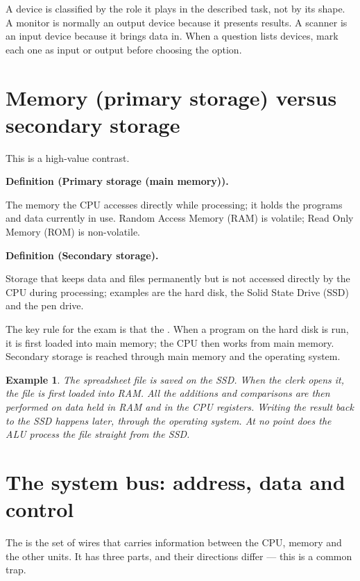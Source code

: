 \documentclass[11pt]{article}
\newtheorem{example}{Example}[section]
\newenvironment{definitionbox}[1]{%
  \par\noindent\textbf{Definition (#1).}\ \itshape
}{\par\vspace{0.3em}}
\begin{document}
A device is classified by the role it plays in the described task, not by its
shape. A monitor is normally an output device because it presents results. A
scanner is an input device because it brings data in. When a question lists
devices, mark each one as input or output before choosing the option.

\section{Memory (primary storage) versus secondary storage}
This is a high-value contrast.

\begin{definitionbox}{Primary storage (main memory)}
The memory the CPU accesses directly while processing; it holds the programs
and data currently in use. Random Access Memory (RAM) is volatile; Read Only
Memory (ROM) is non-volatile.
\end{definitionbox}

\begin{definitionbox}{Secondary storage}
Storage that keeps data and files permanently but is not accessed directly by
the CPU during processing; examples are the hard disk, the Solid State Drive
(SSD) and the pen drive.
\end{definitionbox}

The key rule for the exam is that the . When a program on the hard disk is run, it is first
loaded into main memory; the CPU then works from main memory. Secondary
storage is reached through main memory and the operating system.

\begin{example}
The spreadsheet file is saved on the SSD. When the clerk opens it, the file is
first loaded into RAM. All the additions and comparisons are then performed
on data held in RAM and in the CPU registers. Writing the result back to the
SSD happens later, through the operating system. At no point does the ALU
process the file straight from the SSD.
\end{example}

\section{The system bus: address, data and control}
The  is the set of wires that carries information between the
CPU, memory and the other units. It has three parts, and their directions
differ --- this is a common trap.
\end{document}
